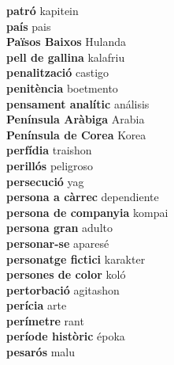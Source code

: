 \textbf{ patró  } kapitein \\
\textbf{ país  } pais \\
\textbf{ Països Baixos  } Hulanda \\
\textbf{ pell de gallina  } kalafriu \\
\textbf{ penalització  } castigo \\
\textbf{ penitència  } boetmento \\
\textbf{ pensament analític  } análisis \\
\textbf{ Península Aràbiga  } Arabia \\
\textbf{ Península de Corea  } Korea \\
\textbf{ perfídia  } traishon \\
\textbf{ perillós  } peligroso \\
\textbf{ persecució  } yag \\
\textbf{ persona a càrrec  } dependiente \\
\textbf{ persona de companyia  } kompai \\
\textbf{ persona gran  } adulto \\
\textbf{ personar-se  } aparesé \\
\textbf{ personatge fictici  } karakter \\
\textbf{ persones de color  } koló \\
\textbf{ pertorbació  } agitashon \\
\textbf{ perícia  } arte \\
\textbf{ perímetre  } rant \\
\textbf{ període històric  } époka \\
\textbf{ pesarós  } malu \\
